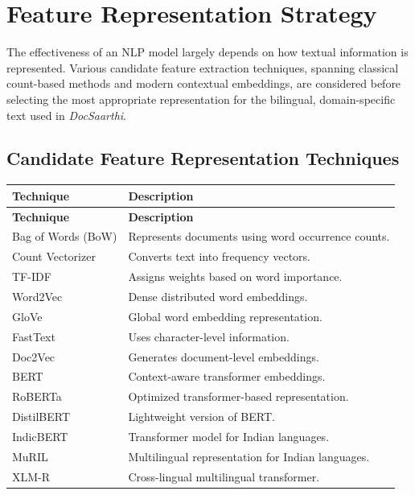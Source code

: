 \section{Feature Representation Strategy}

The effectiveness of an NLP model largely depends on how textual information is represented. Various candidate feature extraction techniques, spanning classical count-based methods and modern contextual embeddings, are considered before selecting the most appropriate representation for the bilingual, domain-specific text used in \textit{DocSaarthi}.

\subsection{Candidate Feature Representation Techniques}

\begin{longtable}{|p{4cm}|p{9cm}|}
\hline
\textbf{Technique} & \textbf{Description} \\
\hline
\endfirsthead
\hline
\textbf{Technique} & \textbf{Description} \\
\hline
\endhead
Bag of Words (BoW) & Represents documents using word occurrence counts.\\
\hline
Count Vectorizer & Converts text into frequency vectors.\\
\hline
TF-IDF & Assigns weights based on word importance.\\
\hline
Word2Vec & Dense distributed word embeddings.\\
\hline
GloVe & Global word embedding representation.\\
\hline
FastText & Uses character-level information.\\
\hline
Doc2Vec & Generates document-level embeddings.\\
\hline
BERT & Context-aware transformer embeddings.\\
\hline
RoBERTa & Optimized transformer-based representation.\\
\hline
DistilBERT & Lightweight version of BERT.\\
\hline
IndicBERT & Transformer model for Indian languages.\\
\hline
MuRIL & Multilingual representation for Indian languages.\\
\hline
XLM-R & Cross-lingual multilingual transformer.\\
\hline
\end{longtable}

